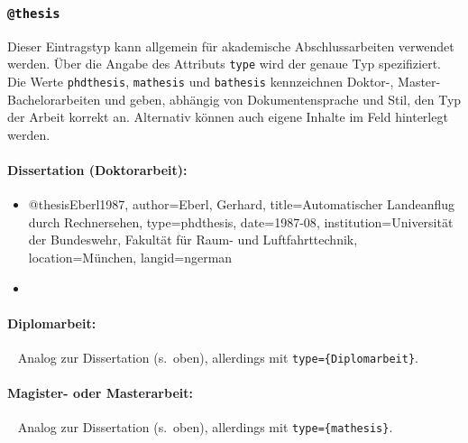 
\subsubsection{\texttt{\bfseries @thesis}}
\label{sec:@thesis}

Dieser Eintragstyp kann allgemein für akademische Abschlussarbeiten verwendet
werden. Über die Angabe des Attributs \texttt{type} wird der genaue Typ
spezifiziert. Die Werte \texttt{phdthesis}, \texttt{mathesis} und
\texttt{bathesis} kennzeichnen Doktor-, Master- \bzw Bachelorarbeiten und
geben, abhängig von Dokumentensprache und Stil, den Typ der Arbeit korrekt an.
Alternativ können auch eigene Inhalte im Feld hinterlegt werden.

\paragraph{Dissertation (Doktorarbeit):}
%
\begin{itemize}
\item[]
\begin{GenericCode}[numbers=none]
@thesis{Eberl1987,
  author={Eberl, Gerhard},
  title={Automatischer Landeanflug durch Rechnersehen},
  type={phdthesis},
  date={1987-08},
  institution={Universität der Bundeswehr, Fakultät für Raum- und Luftfahrttechnik},
  location={München},
  langid={ngerman}
}
\end{GenericCode}
\item[\cite{Eberl1987}] 
\end{itemize}

\paragraph{Diplomarbeit:} ~ \newline
Analog zur Dissertation (s.\ oben), allerdings mit
\texttt{type=\obnh\{Diplomarbeit\}}.


\paragraph{Magister- oder Masterarbeit:} ~ \newline
Analog zur Dissertation (s.\ oben), allerdings mit \texttt{type=\{mathesis\}}.%

